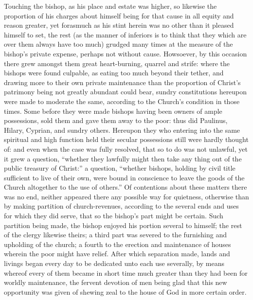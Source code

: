 Touching the bishop, as his place and estate was higher, so likewise the proportion of his charges about himself being for that cause in all equity and reason greater, yet forasmuch as his stint herein was no other than it pleased himself to set, the rest (as the manner of inferiors is to think that they which are over them always have too much) grudged many times at the measure of the bishop’s private expense, perhaps not without cause. Howsoever, by this occasion there grew amongst them great heart-burning, quarrel and strife: where the bishops were found culpable, as eating too much beyond their tether, and drawing more to their own private maintenance than the proportion of Christ’s patrimony being not greatly abundant could bear, sundry constitutions hereupon were made to moderate the same, according to the Church’s condition in  those times. Some before they were made bishops having been owners of ample possessions, sold them and gave them away to the poor: thus did Paulinus, Hilary, Cyprian, and sundry others. Hereupon they who entering into the same spiritual and high function held their secular possessions still were hardly thought of: and even when the case was fully resolved, that so to do was not unlawful, yet it grew a question, “whether they lawfully might then take any thing out of the public treasury of Christ:” a question, “whether bishops, holding by civil title sufficient to live of their own, were bound in conscience to leave the goods of the Church altogether to the use of others.” Of contentions about these matters there was no end, neither appeared there any possible way for quietness, otherwise than by making partition of church-revenues, according to the several ends and uses for which they did serve, that so the bishop’s part might be certain. Such partition being made, the bishop enjoyed  his portion several to himself; the rest of the clergy likewise theirs; a third part was severed to the furnishing and upholding of the church; a fourth to the erection and maintenance of houses wherein the poor might have relief. After which separation made, lands and livings began every day to be dedicated unto each use severally, by means whereof every of them became in short time much greater than they had been for worldly maintenance, the fervent devotion of men being glad that this new opportunity was given of shewing zeal to the house of God in more certain order.

